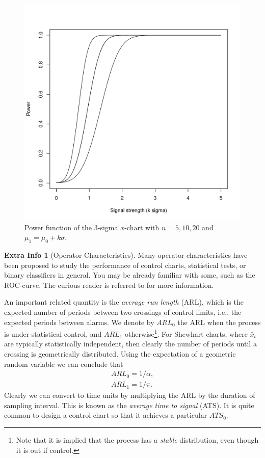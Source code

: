\documentclass[12pt,a4paper]{report}
\theoremstyle{plain}
\theoremstyle{definition}
\newtheorem{extra}{Extra Info}
\newcommand{\barxChart}{$\bar{x}$-chart }
\begin{document}
\begin{figure}[h]
\centering
\includegraphics[height=0.3\textheight]{art/power_function.pdf}
\caption[Power Function]{Power function of the 3-sigma \barxChart with $n=5,10,20$ and $\mu_1=\mu_0 + k \sigma$.}
\label{fig:power_function}
\end{figure}

\begin{extra}[Operator Characteristics]
Many operator characteristics have been proposed to study the performance of control charts, statistical tests, or binary classifiers in general.
You may be already familiar with some, such as the ROC-curve. 
The curious reader is referred to \cite{wikipedia_receiver_2015} for more information.
\end{extra}


An important related quantity is the \emph{average run length} (ARL), which is the expected number of periods between two crossings of control limits, i.e., the expected periods between alarms. 
We denote by $ARL_0$ the ARL when the process is under statistical control, and $ARL_1$ otherwise\footnote{Note that it is implied that the process has a \emph{stable} distribution, even though it is out if control.}. 
For Shewhart charts, where $\bar{x}_t$ are typically statistically independent, then clearly the number of periods until a crossing is geometrically distributed. Using the expectation of a geometric random variable we can conclude that 
\begin{align}
	ARL_0=1/\alpha \label{eq:arl_0}, \\
	ARL_1=1/\pi \label{eq:arl_1}.
\end{align}
Clearly we can convert to time units by multiplying the ARL by the duration of sampling interval.
This is known as the \emph{average time to signal} (ATS).
It is quite common to design a control chart so that it achieves a particular $ATS_0$.
\end{document}
